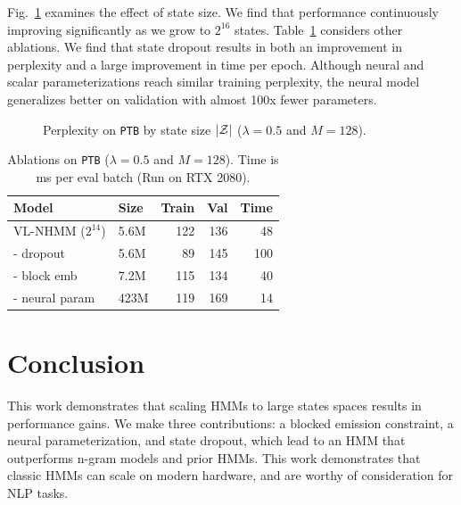 \documentclass[11pt,a4paper]{article}
\begin{document}
Fig.~\ref{tbl:states-ablation} examines the effect of state size.
We find that performance continuously improving significantly as we grow to $2^{16}$ states.
Table~\ref{tbl:dropout-param-ablation} considers other ablations.
We find that state dropout results in both an improvement in perplexity and
a large improvement in time per epoch.
Although neural and scalar parameterizations reach similar training perplexity,
the neural model generalizes better on validation
with almost 100x fewer parameters.

\begin{figure}[!t]
\centering
{}
\caption{\label{tbl:states-ablation}
Perplexity on \texttt{PTB} by state size $|\mathcal{Z}|$ ($\lambda =0.5$ and $M=128$).
}
\end{figure}


\begin{table}[!t]
\centering
\begin{tabular}{llrrr}
\toprule
Model                           & Size & Train  & Val  &  Time \\
\midrule
VL-NHMM ($2^{14}$)       & 5.6M       & 122    & 136  & 48\\
\quad - dropout              & 5.6M       & 89     & 145  & 100\\
\quad - block emb & 7.2M     & 115    & 134  & 40\\
\quad - neural param & 423M  & 119    & 169 & 14
\\
\bottomrule
\end{tabular}
\caption{\label{tbl:dropout-param-ablation}
Ablations on \texttt{PTB} ($\lambda =0.5$ and $M=128$). 
Time is ms per eval batch (Run on RTX 2080).
}
\end{table}


\section{Conclusion}
This work demonstrates that scaling HMMs to large states spaces results in performance gains.
We make three contributions: a blocked emission constraint, a neural parameterization,
and state dropout, which lead to an HMM that outperforms n-gram models and prior HMMs.
This work demonstrates that classic HMMs can scale on modern hardware,
and are worthy of consideration for NLP tasks. 
\end{document}
